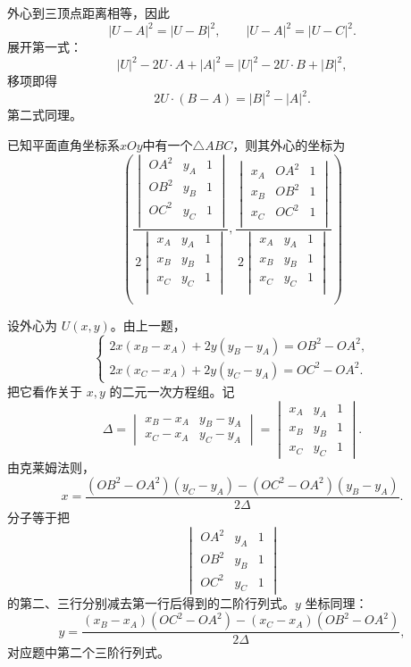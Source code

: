 \begin{solution}
外心到三顶点距离相等，因此
\[
|U-A|^2=|U-B|^2,\qquad |U-A|^2=|U-C|^2.
\]
展开第一式：
\[
|U|^2-2U\cdot A+|A|^2=|U|^2-2U\cdot B+|B|^2,
\]
移项即得
\[
2U\cdot(B-A)=|B|^2-|A|^2.
\]
第二式同理。
\end{solution}
\begin{example}[三角形外心坐标]
    已知平面直角坐标系$xOy$中有一个$\triangle{ABC}$，则其外心的坐标为\[
    \left(\dfrac{\begin{vmatrix}
    OA^2 & y_A & 1\\
    OB^2 & y_B & 1\\
    OC^2 & y_C & 1\\
\end{vmatrix}}{2\begin{vmatrix}
    x_A & y_A & 1\\
    x_B & y_B & 1\\
    x_C & y_C & 1\\
\end{vmatrix}},\dfrac{\begin{vmatrix}
    x_A & OA^2 & 1\\
    x_B & OB^2 & 1\\
    x_C & OC^2 & 1\\
\end{vmatrix}}{2\begin{vmatrix}
    x_A & y_A & 1\\
    x_B & y_B & 1\\
    x_C & y_C & 1\\
\end{vmatrix}}\right)
\]\end{example}
\begin{solution}
设外心为 $U(x,y)$。由上一题，
\[
\begin{cases}
2x(x_B-x_A)+2y(y_B-y_A)=OB^2-OA^2,\\
2x(x_C-x_A)+2y(y_C-y_A)=OC^2-OA^2.
\end{cases}
\]
把它看作关于 $x,y$ 的二元一次方程组。记
\[
\Delta=\begin{vmatrix}
x_B-x_A&y_B-y_A\\
x_C-x_A&y_C-y_A
\end{vmatrix}
=\begin{vmatrix}
x_A&y_A&1\\
x_B&y_B&1\\
x_C&y_C&1
\end{vmatrix}.
\]
由克莱姆法则，
\[
x=\frac{(OB^2-OA^2)(y_C-y_A)-(OC^2-OA^2)(y_B-y_A)}{2\Delta}.
\]
分子等于把
\[
\begin{vmatrix}
OA^2&y_A&1\\
OB^2&y_B&1\\
OC^2&y_C&1
\end{vmatrix}
\]
的第二、三行分别减去第一行后得到的二阶行列式。$y$ 坐标同理：
\[
y=\frac{(x_B-x_A)(OC^2-OA^2)-(x_C-x_A)(OB^2-OA^2)}{2\Delta},
\]
对应题中第二个三阶行列式。
\end{solution}
